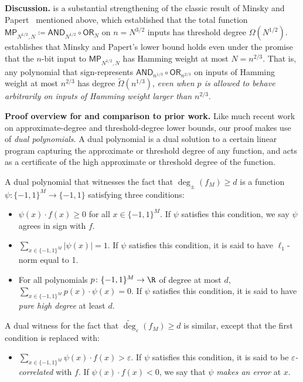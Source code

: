 \documentclass{toc}
\newcommand{\OR}{\mathsf{ OR}}
\newcommand{\bits}{\{-1,1\}}
\newcommand{\eps}{\varepsilon}
\newcommand{\adeg}{\widetilde{\operatorname{deg}}}
\newcommand{\AND}{\mathsf{AND}}
\begin{document}
\noindent \textbf{Discussion.}
 is a substantial strengthening of the classic result
of Minsky and Papert~\cite{mp} mentioned above, %
which established that the total function $\mathsf{MP}_{N^{1/2}, N} \coloneqq  \AND_{N^{1/2}} \circ \OR_N$ on $n=N^{3/2}$
inputs has threshold
degree $\Omega(N^{1/2})$. %
 establishes that Minsky and Papert's lower bound holds even under the promise that the $n$-bit input to $\mathsf{MP}_{N^{1/2}, N}$
has Hamming weight at most $N=n^{2/3}$. That is, any polynomial that sign-represents $\AND_{n^{1/3}} \circ \OR_{n^{2/3}}$ on inputs
of Hamming weight at most $n^{2/3}$
has degree $\tilde{\Omega}(n^{1/3})$, \emph{even when $p$ is allowed to behave arbitrarily on inputs of Hamming weight larger than $n^{2/3}$}. 

\medskip 
\noindent \textbf{Proof overview for  and comparison to prior work.}
Like much recent work on %
%
approxi\-mate-degree and threshold-degree %
 lower bounds, our proof makes 
use of \emph{dual polynomials}. A dual polynomial is a dual solution to a certain linear program capturing the approximate or threshold degree of any function,
and acts as a certificate of the high approximate or threshold degree of the function.

A dual polynomial that witnesses the fact that $\deg_{\pm}(f_M) \geq d$ is a 
function $\psi \colon \bits^M \to \bits$ satisfying three 
%
conditions:%
\begin{itemize}
	\item $\psi(x) \cdot f(x) \geq 0$ for all $x \in \bits^M$. If $\psi$ satisfies this condition, we say $\psi$
	agrees in sign with $f$. 
	\item  $\sum_{x \in \bits^M} |\psi(x)| = 1$. If $\psi$ satisfies this condition, it is said to have $\ell_1$-norm equal to 1.
	\item For all polynomials $p \colon \bits^M \to \R$ of degree at most $d$, $\sum_{x \in \bits^M} p(x) \cdot \psi(x) = 0$. 
	If $\psi$ satisfies this condition, it is said to have \emph{pure high degree} at least $d$.
\end{itemize}
A dual witness for the fact that $\adeg_{\eps}(f_M) \geq d$ is similar, except that the first condition is replaced
with:
\begin{itemize}
	\item $\sum_{x \in \bits^M}\psi(x) \cdot f(x) > \eps$. If $\psi$ satisfies this condition, it is said to be \emph{$\eps$-correlated} with $f$.
	If $\psi(x) \cdot f(x) < 0$, we say that $\psi$ \emph{makes an error} at $x$.
\end{itemize}
\end{document}
